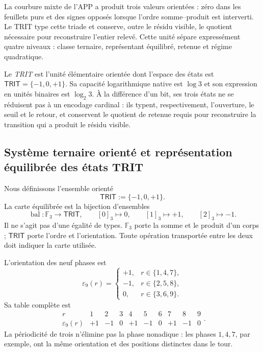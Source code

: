 La courbure mixte de l’APP a produit trois valeurs orientées : zéro dans les feuillets
purs et des signes opposés lorsque l’ordre somme--produit est interverti. Le TRIT
type cette triade et conserve, outre le résidu visible, le quotient nécessaire
pour reconstruire l’entier relevé. Cette unité sépare expressément quatre
niveaux : classe ternaire, représentant équilibré, retenue et régime
quadratique.

\begin{definition}
Le \emph{TRIT} est l’unité élémentaire orientée dont l’espace des états est
\(\mathsf{TRIT}=\{-1,0,+1\}\). Sa capacité logarithmique native est
\(\log 3\) et son expression en unités binaires est \(\log_2 3\). À la différence
d’un bit, ses trois états ne se réduisent pas à un encodage cardinal : ils typent,
respectivement, l’ouverture, le seuil et le retour, et conservent le quotient de
retenue requis pour reconstruire la transition qui a produit le résidu
visible.
\end{definition}

\subsection{Système ternaire orienté et représentation équilibrée des états TRIT}

Nous définissons l’ensemble orienté
\[
 \mathsf{TRIT}:=\{-1,0,+1\}.
\]
La carte équilibrée est la bijection d’ensembles
\[
 \operatorname{bal}:\mathbb F_3\longrightarrow\mathsf{TRIT},
 \qquad
 [0]_3\mapsto0,\qquad[1]_3\mapsto+1,\qquad[2]_3\mapsto-1.
\]
Il ne s’agit pas d’une égalité de types. \(\mathbb F_3\) porte la somme et le produit
d’un corps ; \(\mathsf{TRIT}\) porte l’ordre et l’orientation. Toute opération
transportée entre les deux doit indiquer la carte utilisée.

L’orientation des neuf phases est
\[
 \varepsilon_9(r)=
 \begin{cases}
 +1,&r\in\{1,4,7\},\\
 -1,&r\in\{2,5,8\},\\
 0,&r\in\{3,6,9\}.
 \end{cases}
\]
Sa table complète est
\[
\begin{array}{c|ccccccccc}
r&1&2&3&4&5&6&7&8&9\\\hline
\varepsilon_9(r)&+1&-1&0&+1&-1&0&+1&-1&0
\end{array}.
\]
La périodicité de trois n’élimine pas la phase nonadique : les phases
\(1,4,7\), par exemple, ont la même orientation et des positions distinctes
dans le tour.

